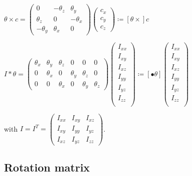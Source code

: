 \documentclass[\main/main.tex]{subfiles}
\begin{document}
{\centering
 $ \theta \times c =
 \begin{pmatrix}
  0         & -\theta_z & \theta_y  \\
  \theta_z  & 0         & -\theta_x \\
  -\theta_y &   \theta_x  & 0
 \end{pmatrix}
 \begin{pmatrix}
  c_x \\
  c_y \\
  c_z
 \end{pmatrix}
 \coloneqq \left[ \theta \times \right] c$
 \par}

{\centering
 $ I \ast \theta =
 \begin{pmatrix}
  \theta_x & \theta_y & \theta_z & 0        & 0        & 0        \\
  0        & \theta_x & 0        & \theta_y & \theta_z & 0        \\
  0        & 0        & \theta_x & 0        & \theta_y & \theta_z
 \end{pmatrix}
 \begin{pmatrix}
  I_{xx} \\
  I_{xy} \\
  I_{xz} \\
  I_{yy} \\
  I_{yz} \\
  I_{zz} \\
 \end{pmatrix}
 \coloneqq \left[ \bullet \theta \right]
 \begin{pmatrix}
  I_{xx} \\
  I_{xy} \\
  I_{xz} \\
  I_{yy} \\
  I_{yz} \\
  I_{zz} \\
 \end{pmatrix}$
 \par}

with $I = I^T =
\begin{pmatrix}
 I_{xx} & I_{xy} & I_{xz} \\
 I_{xy} & I_{yy} & I_{yz} \\
 I_{xz} & I_{yz} & I_{zz}
\end{pmatrix}
$.


\subsection{Rotation matrix}
\label{appendix:notation:rotation}
\end{document}
